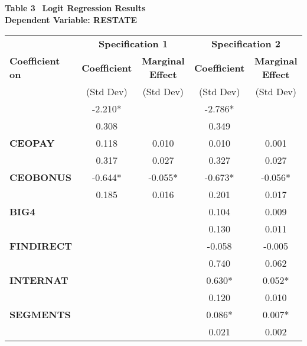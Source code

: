 \begin{table}[t]
\begin{center}
{\bf Table 3} \
{\bf Logit Regression Results} \\
{\bf Dependent Variable:  RESTATE} \\[1em]
\begin{tabular}{|l|cc|cc|}
\hline
             & \multicolumn{2}{c|}{\bf Specification 1}  &  \multicolumn{2}{c|}{\bf Specification 2}   \\
 {\bf Coefficient on}  &  {\bf Coefficient} & {\bf Marginal Effect} & {\bf Coefficient} & {\bf Marginal Effect}  \\ 
          &  (Std Dev)  & (Std Dev) &  (Std Dev)  & (Std Dev) \\ \hline
\T {\bf Intercept} &   -2.210*   &   & -2.786*   &    \\
                   &   0.308   &   & 0.349   &   \\[.6em]
 {\bf CEOPAY}    &   0.118    &  0.010  & 0.010    &  0.001   \\
                   &   0.317   &  0.027 & 0.327   &  0.027 \\[.6em]
 {\bf CEOBONUS}  &   -0.644*   &  -0.055* & -0.673*   &  -0.056*  \\
                   &   0.185   &  0.016 & 0.201   &  0.017 \\[.6em]
 {\bf BIG4 }  &       &    & 0.104    &  0.009   \\
                   &      &   & 0.130   &  0.011 \\[.6em]
 {\bf FINDIRECT}  &       &    & -0.058    &  -0.005   \\
                   &      &   & 0.740   &  0.062 \\[.6em]
 {\bf INTERNAT }  &       &    & 0.630*   &  0.052*  \\
                   &      &   & 0.120   &  0.010 \\[.6em]
 {\bf SEGMENTS}  &       &    & 0.086*   &  0.007*  \\
                   &      &   & 0.021   &  0.002 \\[.6em]
\hline
\end{tabular}
\end{center}
\end{table}

